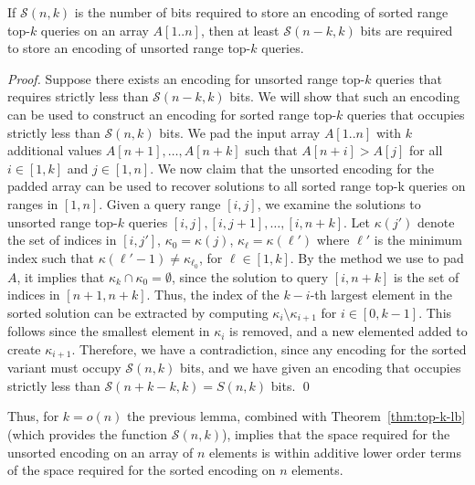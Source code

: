 \documentclass[runningheads]{llncs}
\begin{document}
\begin{lemma}
If $\mathcal{S}(n,k)$ is the number of bits required to store an
encoding of sorted range top-$k$ queries on an array $A[1..n]$, then
at least $\mathcal{S}(n - k,k)$ bits are required to store an encoding
of unsorted range top-$k$ queries.
\end{lemma}

\begin{proof}
Suppose there exists an encoding for unsorted range top-$k$ queries
that requires strictly less than $\mathcal{S}(n-k,k)$ bits.  We will
show that such an encoding can be used to construct an encoding for
sorted range top-$k$ queries that occupies strictly less than
$\mathcal{S}(n,k)$ bits.  We pad the input array $A[1..n]$ with $k$
additional values $A[n+1], \ldots, A[n+k]$ such that $A[n+i] > A[j]$
for all $i \in [1,k]$ and $j \in [1,n]$.  We now claim that the
unsorted encoding for the padded array can be used to recover
solutions to all sorted range top-k queries on ranges in $[1,n]$.
Given a query range $[i,j]$, we examine the solutions to unsorted
range top-$k$ queries $[i, j], [i,j+1], \ldots , [i,n+k]$.  Let
$\kappa(j')$ denote the set of indices in $[i,j']$, $\kappa_0 =
\kappa(j)$, $\kappa_\ell = \kappa(\ell')$ where $\ell'$ is the minimum
index such that $\kappa(\ell'-1) \neq \kappa_{\ell_0}$, for $\ell \in
[1,k]$.  By the method we use to pad $A$, it implies that $\kappa_{k}
\cap \kappa_0 = \emptyset$, since the solution to query $[i,n+k]$ is
the set of indices in $[n+1,n+k]$.  Thus, the index of the $k-i$-th
largest element in the sorted solution can be extracted by computing
$\kappa_i \setminus \kappa_{i+1}$ for $i \in [0,k-1]$.  This follows
since the smallest element in $\kappa_i$ is removed, and a new
elemented added to create $\kappa_{i+1}$.  Therefore, we have a
contradiction, since any encoding for the sorted variant must occupy
$\mathcal{S}(n,k)$ bits, and we have given an encoding that occupies
strictly less than $\mathcal{S}(n+k-k,k) = S(n,k)$ bits. \qed
\end{proof}

Thus, for $k=o(n)$ the previous lemma, combined with
Theorem~\ref{thm:top-k-lb} (which provides the function
$\mathcal{S}(n,k)$), implies that the space required for the unsorted
encoding on an array of $n$ elements is within additive lower order
terms of the space required for the sorted encoding on $n$ elements.
\end{document}
